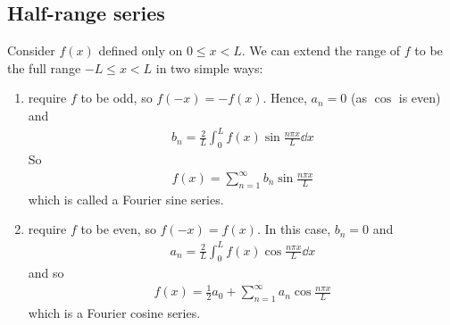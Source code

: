     \subsection{Half-range series}
    Consider $f(x)$ defined only on $0 \leq x < L$.
    We can extend the range of $f$ to be the full range $-L \leq x < L$ in two simple ways:
    \begin{enumerate}
        \item require $f$ to be odd, so $f(-x) = -f(x)$.
            Hence, $a_n = 0$ (as $\cos$ is even) and
            \begin{align} \label{eq:1.11}
                b_n = \frac{2}{L} \int_0^L f(x) \sin \frac{n \pi x}{L} \dd{x}
            \end{align}
            So
            \begin{align*}
                f(x) = \sum_{n=1}^\infty b_n \sin \frac{n\pi x}{L}
            \end{align*}
            which is called a Fourier sine series.
        \item require $f$ to be even, so $f(-x) = f(x)$.
            In this case, $b_n = 0$ and
            \begin{align} \label{eq:1.12}
                a_n = \frac{2}{L} \int_0^L f(x) \cos \frac{n \pi x}{L} \dd{x}
            \end{align}
            and so
            \begin{align*}
                f(x) = \frac{1}{2}a_0 + \sum_{n=1}^\infty a_n \cos \frac{n\pi x}{L}
            \end{align*}
            which is a Fourier cosine series.
    \end{enumerate}

